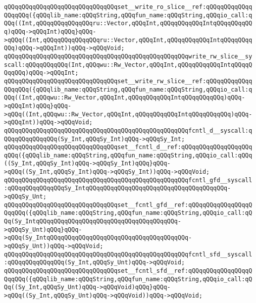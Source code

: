 \verb|qQQqqQQqqQQqqQQqqQQqqQQqqQQqqQQqset__write_ro_slice__ref:qQQqqQQqqQQqqQQqqQQq({qQQqlib_name:qQQqString,qQQqfun_name:qQQqString,qQQqio_call:qQQq((Int,qQQqqQQqqQQqqQQqru::Vector,qQQqInt,qQQqqQQqqQQqIntqQQqqQQqqQQq)qQQq->qQQqInt)qQQq}qQQq->qQQq((Int,qQQqqQQqqQQqqQQqru::Vector,qQQqInt,qQQqqQQqqQQqIntqQQqqQQqqQQq)qQQq->qQQqInt))qQQq->qQQqVoid;|\newline
\newline
\verb|qQQqqQQqqQQqqQQqqQQqqQQqqQQqqQQqqQQqqQQqqQQqqQQqqQQqwrite_rw_slice__syscall:qQQqqQQqqQQq(Int,qQQqwu::Rw_Vector,qQQqInt,qQQqqQQqqQQqIntqQQqqQQqqQQq)qQQq->qQQqInt;|\newline
\verb|qQQqqQQqqQQqqQQqqQQqqQQqqQQqqQQqset__write_rw_slice__ref:qQQqqQQqqQQqqQQqqQQq({qQQqlib_name:qQQqString,qQQqfun_name:qQQqString,qQQqio_call:qQQq((Int,qQQqwu::Rw_Vector,qQQqInt,qQQqqQQqqQQqIntqQQqqQQqqQQq)qQQq->qQQqInt)qQQq}qQQq->qQQq((Int,qQQqwu::Rw_Vector,qQQqInt,qQQqqQQqqQQqIntqQQqqQQqqQQq)qQQq->qQQqInt))qQQq->qQQqVoid;|\newline
\newline
\verb|qQQqqQQqqQQqqQQqqQQqqQQqqQQqqQQqqQQqqQQqqQQqqQQqqQQqfcntl_d__syscall:qQQqqQQqqQQqqQQq(Sy_Int,qQQqSy_Int)qQQq->qQQqSy_Int;|\newline
\verb|qQQqqQQqqQQqqQQqqQQqqQQqqQQqqQQqset__fcntl_d__ref:qQQqqQQqqQQqqQQqqQQqqQQq({qQQqlib_name:qQQqString,qQQqfun_name:qQQqString,qQQqio_call:qQQq((Sy_Int,qQQqSy_Int)qQQq->qQQqSy_Int)qQQq}qQQq->qQQq((Sy_Int,qQQqSy_Int)qQQq->qQQqSy_Int))qQQq->qQQqVoid;|\newline
\newline
\verb|qQQqqQQqqQQqqQQqqQQqqQQqqQQqqQQqqQQqqQQqqQQqqQQqqQQqfcntl_gfd__syscall:qQQqqQQqqQQqqQQqSy_IntqQQqqQQqqQQqqQQqqQQqqQQqqQQqqQQqqQQqqQQq->qQQqSy_Unt;|\newline
\verb|qQQqqQQqqQQqqQQqqQQqqQQqqQQqqQQqset__fcntl_gfd__ref:qQQqqQQqqQQqqQQqqQQqqQQq({qQQqlib_name:qQQqString,qQQqfun_name:qQQqString,qQQqio_call:qQQq(Sy_IntqQQqqQQqqQQqqQQqqQQqqQQqqQQqqQQqqQQqqQQq->qQQqSy_Unt)qQQq}qQQq->qQQq(Sy_IntqQQqqQQqqQQqqQQqqQQqqQQqqQQqqQQqqQQqqQQq->qQQqSy_Unt))qQQq->qQQqVoid;|\newline
\newline
\verb|qQQqqQQqqQQqqQQqqQQqqQQqqQQqqQQqqQQqqQQqqQQqqQQqqQQqfcntl_sfd__syscall:qQQqqQQqqQQqqQQq(Sy_Int,qQQqSy_Unt)qQQq->qQQqVoid;|\newline
\verb|qQQqqQQqqQQqqQQqqQQqqQQqqQQqqQQqset__fcntl_sfd__ref:qQQqqQQqqQQqqQQqqQQqqQQq({qQQqlib_name:qQQqString,qQQqfun_name:qQQqString,qQQqio_call:qQQq((Sy_Int,qQQqSy_Unt)qQQq->qQQqVoid)qQQq}qQQq->qQQq((Sy_Int,qQQqSy_Unt)qQQq->qQQqVoid))qQQq->qQQqVoid;|\newline
